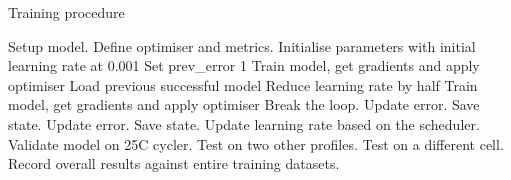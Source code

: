 \begin{algorithm}
    \caption{Training procedure}
        \begin{algorithmic}[1]
            \STATE Setup model. Define optimiser and metrics.
            \STATE Initialise parameters with initial learning rate at 0.001
            \STATE Set prev\_error 1
                \STATE Train model, get gradients and apply optimiser
                    \label{alg:training-check}
                        \STATE Load previous successful model   \label{alg:training-recovery-start}
                        \STATE Reduce learning rate by half
                        \STATE Train model, get gradients and apply optimiser
                            \STATE Break the loop. Update error. Save state. \label{alg:training-recovery-end}
                        \ENDIF
                    \ENDWHILE
                \ELSE
                    \STATE Update error. Save state. \label{alg:training-succes}
                    \STATE Update learning rate based on the scheduler.
                \ENDIF
                \STATE Validate model on 25\textdegree{}C cycler.   \label{alg:training-valid}
                \STATE Test on two other profiles. \label{alg:training-test}
                \STATE Test on a different cell.
            \ENDWHILE
            \STATE Record overall results against entire training datasets. \label{alg:training-end}
        \end{algorithmic}
    \label{alg:training}
\end{algorithm}

